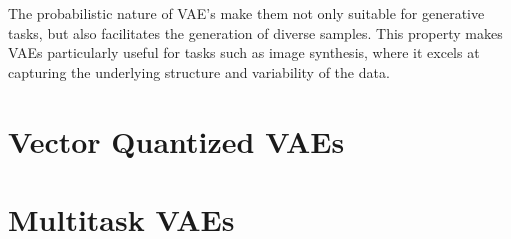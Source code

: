 The probabilistic nature of VAE's make them not only suitable for generative tasks, but also facilitates the generation of diverse samples. This property makes VAEs particularly useful for tasks such as image synthesis, where it excels at capturing the underlying structure and variability of the data\cite{Kingma_2019}.

\section{Vector Quantized VAEs}
\section{Multitask VAEs}